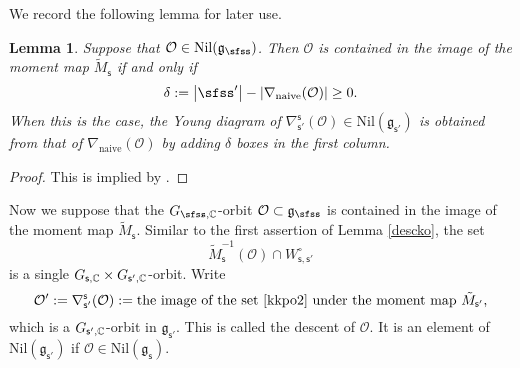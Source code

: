 \documentclass[12pt,a4paper]{amsart}
\def\abs#1{\left|{#1}\right|}
\newcommand{\CO}{{\mathcal {O}}}
\newcommand{\g}{\mathfrak g}
\def\DD{\nabla}
\newcommand{\be}{\begin {equation}}
\newcommand{\ee}{\end {equation}}
\numberwithin{equation}{section}
\newtheorem{lem}[thm]{Lemma}
\theoremstyle{remark}
\begin{document}
We record the following lemma for later use.
\begin{lem}\label{imageofmm}
Suppose that $\CO\in \mathrm{Nil}(\g_\sfss)$. Then  $\CO$ is contained in the image of the moment map $\tilde M_{\mathsf s}$ if and only if
\[
 \delta:=  \abs{\sfss'}-\abs{\DD_\mathrm{naive}(\CO)}\geq 0.
\]
When this is the case, the Young diagram of $\DD_{\mathsf s'}^{\mathsf s}(\CO)\in \mathrm{Nil}(\g_{\mathsf s'})$ is obtained from that of $\DD_\mathrm{naive}(\CO)$ by adding $\delta$ boxes in the first column.

\end{lem}
\begin{proof}
This is implied by \cite[Theorem 3.6]{DKPC}.
\end{proof}

Now we suppose that the $G_{\sfss, \C}$-orbit $\CO\subset\g_\sfss$
  is contained in the image of the moment map $\tilde M_{\mathsf s}$. Similar to
the first assertion of Lemma \ref{descko}, the set
\be\label{kkpo2}
  \tilde M_{\mathsf s}^{-1}(\CO)\cap W_{\mathsf s, \mathsf s'}^\circ
\ee
is a single $G_{\mathsf s,\mathbb{C}}\times G_{\mathsf s', \mathbb{C}}$-orbit.
Write
\[
 \CO':= \nabla^{\mathsf s}_{\mathsf s'}(\CO):=\textrm{the image of the set \eqref{kkpo2} under the moment map  $\tilde M_{\mathsf s'}$,}
\]
which is a $ G_{\mathsf s', \mathbb{C}}$-orbit in $\g_{\mathsf s'}$.
This is  called the descent of $\CO$. It is an element of  $\mathrm{Nil}(\g_{\mathsf s'})$ if $\CO\in \mathrm{Nil}(\g_{\mathsf s})$.
\end{document}

